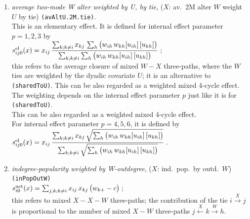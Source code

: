 \documentclass[a4paper,fleqn,11pt]{article}
\newcommand{\+}{\, + \,}
\newcommand{\vit}{\theenumi}
\begin{document}
\begin{enumerate}
 \item
 {\em average two-mode W alter weighted by U, by tie}, ($X$: av.\ 2M alter $W$ weight $U$ by tie)
        \texttt{(avAltU.2M.tie)}. \\[0.2em]
 This is an elementary effect.  It is defined for internal effect parameter $p=1,2,3$ by \\[0.4em]
 $s^{\rm el}_{ij\vit}(x) =  \displaystyle x_{ij}\, \frac{\sum_{k; k \neq i} x_{kj}\,
                   \sum_{h}   \big( w_{ih}\, w_{kh} [u_{ih}]\, [u_{kh}] \big )}
                  {   \sum_{k; k \neq i}  \sum_{h}  \big( w_{ih}\, w_{kh} [u_{ih}]\, [u_{kh}] \big )}
                \,$;\\[0.2em]
 this refers to the average closure of mixed $W-X$ three-paths, where the $W$ ties
 are weighted by the dyadic covariate $U$; it is an alternative to \texttt{(sharedToU)}.
 This can be also regarded as a weighted mixed 4-cycle effect.\\
 The weighting depends on the internal effect parameter $p$ just like it is
 for \texttt{(sharedToU)}.\\
 This can be also regarded as a weighted mixed 4-cycle effect.\\

  For internal effect parameter $p = 4,5,6$, it is defined by \\[0.4em]
 $s^{\rm el}_{ij\vit}(x) =  \displaystyle x_{ij}\, \frac{\sum_{k; k \neq i} x_{kj}\,
                  \sqrt{ \sum_{h}   \big( w_{ih}\, w_{kh} [u_{ih}]\, [u_{kh}] \big )}}
                  {   \sum_{k; k \neq i} \sqrt{ \sum_{h}  \big( w_{ih}\, w_{kh} [u_{ih}]\, [u_{kh}] \big )}}
                \,$.\\[0.2em]

 \item
\begin{minipage}[t]{.6\textwidth}
 {\em indegree-popularity weighted by W-outdegree},
 ($X$: ind.\ pop.\ by outd.\ $W$) \texttt{(inPopOutW)} \\[0.2em]
 $s^{\rm net}_{i\vit}(x) = \sum_{j,k; k \neq i} x_{ij}\, x_{kj}\,
                  \big(  w_{k+} - c\big ) \,$;\\[0.2em]
 this refers to  mixed $X-X-W$ three-paths;
 the contribution of the tie $i \stackrel{X}{\rightarrow} j$
 is proportional to
 the number of mixed $X-W$ three-paths
 $ j  \stackrel{X}{\leftarrow} k  \stackrel{W}{\rightarrow} h$.


\end{minipage}
\end{enumerate}
\end{document}
